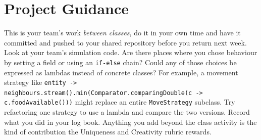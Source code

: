 \documentclass[twoside=false,DIV=14]{scrartcl}
\begin{document}
\section*{Project Guidance}

This is your team's work \emph{between classes}, do it in your own time and have it committed and pushed to your shared repository before you return next week.  Look at your team's simulation code.  Are there places where you chose behaviour by setting a field or using an \texttt{if-else} chain?  Could any of those choices be expressed as lambdas instead of concrete classes?  For example, a movement strategy like \texttt{entity -> neighbours.stream().min(Comparator.comparingDouble(c -> c.foodAvailable()))} might replace an entire \texttt{MoveStrategy} subclass.  Try refactoring one strategy to use a lambda and compare the two versions.  Record what you did in your log book.  Anything you add beyond the class activity is the kind of contribution the Uniqueness and Creativity rubric rewards.
\end{document}
